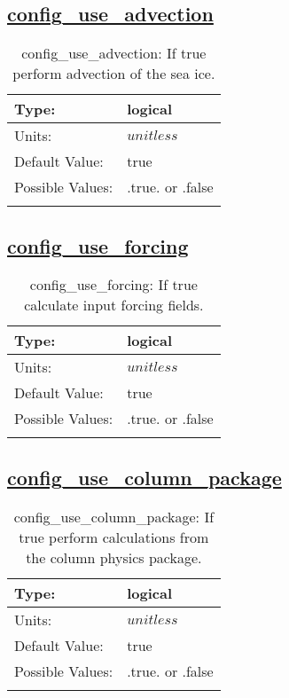 \subsection[config\_use\_advection]{\hyperref[sec:nm_tab_use_sections]{config\_use\_advection}}
\label{subsec:nm_sec_config_use_advection}
\begin{center}
\begin{longtable}{| p{2.0in} || p{4.0in} |}
    \hline
    Type: & logical \\
    \hline
    Units: & $unitless$ \\
    \hline
    Default Value: & true \\
    \hline
    Possible Values: & .true. or .false \\
    \hline
    \caption{config\_use\_advection: If true perform advection of the sea ice.}
\end{longtable}
\end{center}
\subsection[config\_use\_forcing]{\hyperref[sec:nm_tab_use_sections]{config\_use\_forcing}}
\label{subsec:nm_sec_config_use_forcing}
\begin{center}
\begin{longtable}{| p{2.0in} || p{4.0in} |}
    \hline
    Type: & logical \\
    \hline
    Units: & $unitless$ \\
    \hline
    Default Value: & true \\
    \hline
    Possible Values: & .true. or .false \\
    \hline
    \caption{config\_use\_forcing: If true calculate input forcing fields.}
\end{longtable}
\end{center}
\subsection[config\_use\_column\_package]{\hyperref[sec:nm_tab_use_sections]{config\_use\_column\_package}}
\label{subsec:nm_sec_config_use_column_package}
\begin{center}
\begin{longtable}{| p{2.0in} || p{4.0in} |}
    \hline
    Type: & logical \\
    \hline
    Units: & $unitless$ \\
    \hline
    Default Value: & true \\
    \hline
    Possible Values: & .true. or .false \\
    \hline
    \caption{config\_use\_column\_package: If true perform calculations from the column physics package.}
\end{longtable}
\end{center}
